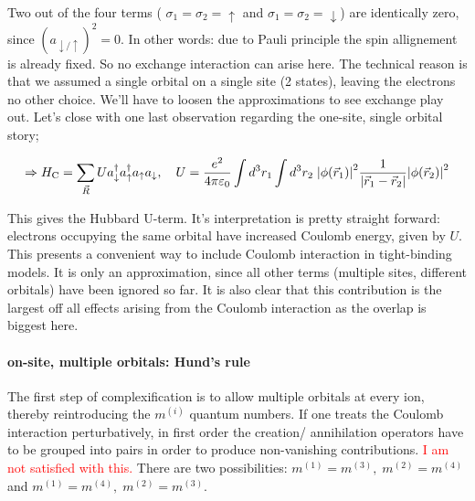 \documentclass[../../main.tex]{subfiles}
\begin{document}
Two out of the four terms ( $\sigma_1 = \sigma_2 = \uparrow$ and $\sigma_1 = \sigma_2 = \downarrow$) are identically zero, since $(a_{\downarrow/\uparrow})^2=0$. In other words: due to Pauli principle the spin allignement is already fixed. So no exchange interaction can arise here. The technical reason is that we assumed a single orbital on a single site (2 states), leaving the electrons no other choice. We'll have to loosen the approximations to see exchange play out. Let's close with one last observation regarding the one-site, single orbital story;

\begin{equation}
	\Rightarrow H_{\text{C}} = \sum_{\vec{R}} U a_{\downarrow}^\dagger a_{\uparrow}^\dagger a_{\uparrow} a_{\downarrow}, \quad U = \frac{e^2}{4\pi\varepsilon_0}\int d^3r_1 \int d^3r_2 \; \abs{\phi(\vec{r}_1)}^2 \frac{1}{\abs{\vec{r}_1-\vec{r}_2}} \abs{\phi(\vec{r}_2)}^2 
\end{equation}

This gives the Hubbard U-term. It's interpretation is pretty straight forward: electrons occupying the same orbital have increased Coulomb energy, given by $U$. This presents a convenient way to include Coulomb interaction in tight-binding models. It is only an approximation, since all other terms (multiple sites, different orbitals) have been ignored so far. It is also clear that this contribution is the largest off all effects arising from the Coulomb interaction as the overlap is biggest here. 



\paragraph{on-site, multiple orbitals: Hund's rule} 

\hfill \newline

The first step of complexification is to allow multiple orbitals at every ion, thereby reintroducing the $m^{(i)}$ quantum numbers. If one treats the Coulomb interaction perturbatively, in first order the creation/ annihilation operators have to be grouped into pairs in order to produce non-vanishing contributions. \textcolor{red}{I am not satisfied with this.} There are two possibilities: $m^{(1)} = m^{(3)}, \; m^{(2)} = m^{(4)}$ and $m^{(1)} = m^{(4)}, \; m^{(2)} = m^{(3)}$. 
\end{document}
